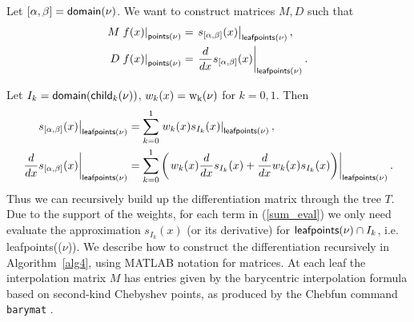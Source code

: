 Let $[\alpha,\beta]=\text{\textsf{domain}($\nu$)}$. We want to construct matrices $M,D$ such that 
\begin{equation}
\begin{aligned}
M \left . f(x) \right |_{\text{\textsf{points}($\nu$)}} &= \left . s_{[\alpha,\beta]}(x) \right |_{\text{\textsf{leafpoints}($\nu$)}}, \\
D \left . f(x) \right |_{\text{\textsf{points}($\nu$)}} &= \left . \frac{d}{dx} s_{[\alpha,\beta]}(x) \right |_{\text{\textsf{leafpoints}($\nu$)}}.
\end{aligned}
\end{equation}

Let $I_k = \text{\textsf{domain}(\textsf{child}$_{k}$($\nu$))}$, $w_k(x)=\text{w\textsubscript{k}($\nu$)}$ for $k=0,1$. Then
\begin{equation}
\begin{aligned}
\left . s_{[\alpha,\beta]}(x) \right |_{\text{\textsf{leafpoints}($\nu$)}} &= \sum_{k=0}^1 \left . w_k(x) s_{I_k}(x) \right |_{\text{\textsf{leafpoints}($\nu$)}}, \\
\left . \frac{d}{dx} s_{[\alpha,\beta]}(x) \right |_{\text{\textsf{leafpoints}($\nu$)}} &= \sum_{k=0}^1 \left( \left . w_k(x)  \frac{d}{dx} s_{I_k}(x) + \frac{d}{dx} w_k(x)  s_{I_k}(x) \right) \right |_{\text{\textsf{leafpoints}($\nu$)}} .
\end{aligned}
\label{sum_eval}
\end{equation}
Thus we can recursively build up the differentiation matrix through the tree $T$. Due to the support of the weights, for each term in (\ref{sum_eval}) we only need evaluate the approximation $s_{I_k}(x)$ (or its derivative) for $\text{\textsf{leafpoints}($\nu$)} \cap I_k$, i.e. \textsf{leafpoints}(($\nu$)). We describe how to construct the differentiation recursively in Algorithm~\ref{alg4}, using MATLAB notation for matrices. At each leaf the interpolation matrix $M$ has entries given by the barycentric interpolation formula based on second-kind Chebyshev points, as produced by the Chebfun command {\tt barymat} \cite{driscoll2015rectangular}.

